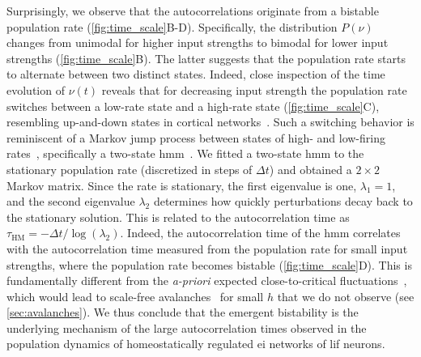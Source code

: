 Surprisingly, we observe that the autocorrelations originate from a bistable population rate (\cref{fig:time_scale}B-D).
Specifically, the distribution $P(\nu)$ changes from unimodal for higher input strengths to bimodal for lower input strengths (\cref{fig:time_scale}B).
The latter suggests that the population rate starts to alternate between two distinct states.
Indeed, close inspection of the time evolution of $\nu(t)$ reveals that for decreasing input strength the population rate switches between a low-rate state and a high-rate state (\cref{fig:time_scale}C), resembling up-and-down states in cortical networks~\cite{wilson_up_2008,stern_spontaneous_1997,cossart_attractor_2003,hidalgo_stochastic_2012}.
Such a switching behavior is reminiscent of a Markov jump process between states of high- and low-firing rates~\cite{ibe_3_2013}, specifically a two-state \gls{hmm}~\cite{rabiner_introduction_1986}.
We fitted a two-state \gls{hmm} to the stationary population rate (discretized in steps of $\Delta t$) and obtained a $2\times 2$ Markov matrix.
Since the rate is stationary, the first eigenvalue is one, $\lambda_1=1$, and the second eigenvalue $\lambda_2$ determines how quickly perturbations decay back to the stationary solution.
This is related to the autocorrelation time as $\tau_\mathrm{HM}=-\Delta t/ \log{(\lambda_2)}$.
Indeed, the autocorrelation time of the \gls{hmm} correlates with the autocorrelation time measured from the population rate for small input strengths, where the population rate becomes bistable (\cref{fig:time_scale}D).
This is fundamentally different from the \textit{a-priori} expected close-to-critical fluctuations~\cite{zierenberg_homeostatic_2018}, which would lead to scale-free avalanches~\cite{beggs_neuronal_2003} for small $h$ that we do not observe (see \cref{sec:avalanches}).
We thus conclude that the emergent bistability is the underlying mechanism of the large autocorrelation times observed in the population dynamics of homeostatically regulated \gls{ei} networks of \gls{lif} neurons.






